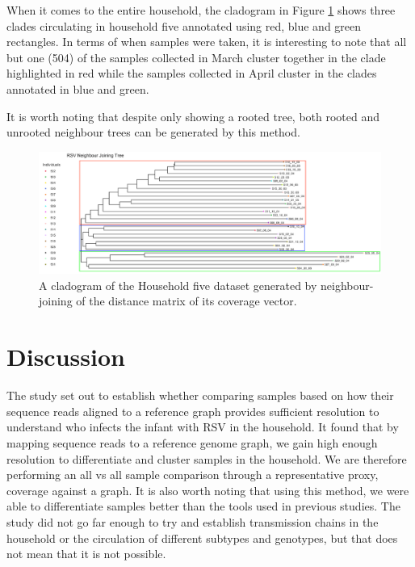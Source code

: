 \documentclass[10pt, a4paper]{article}
\begin{document}
When it comes to the entire household, the cladogram in Figure \ref{fig:org3ca3c54} shows three
clades circulating in household five annotated using red, blue and green rectangles.
In terms of when samples were taken, it is interesting to note that all but one
(504) of the samples collected in March cluster together in the clade
highlighted in red while the samples collected in April cluster in the clades
annotated in blue and green.

It is worth noting that despite only showing a rooted tree, both rooted and
unrooted neighbour trees can be generated by this method.

\begin{figure}
\centering
\includegraphics[width=1.0\textwidth]{../Figures/hh20-clado.png}
\caption[A cladogram of RSV]{\label{fig:org3ca3c54}A cladogram of the Household five dataset generated by neighbour-joining of the distance matrix of its coverage vector.}
\end{figure}
\newpage
\section{Discussion}
\label{sec:org9b13229}
The study set out to establish whether comparing samples based on how their
sequence reads aligned to a reference graph provides sufficient resolution to
understand who infects the infant with RSV in the household.
It found that by mapping sequence reads to a reference genome graph, we gain
high enough resolution to differentiate and cluster samples in the household.
We are therefore performing an all vs all sample comparison through a
representative proxy, coverage against a graph.
It is also worth noting that using this method, we were able to differentiate
samples better than the tools used in previous studies.
The study did not go far enough to try and establish transmission chains in the
household or the circulation of different subtypes and genotypes, but that does
not mean that it is not possible.
\end{document}
